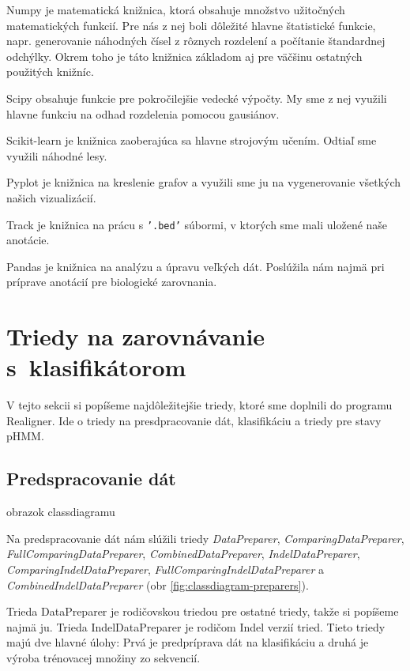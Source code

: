 Numpy je matematická knižnica, ktorá obsahuje množstvo užitočných matematických funkcií. Pre nás z nej boli dôležité hlavne štatistické funkcie, napr. generovanie náhodných čísel z rôznych rozdelení a počítanie štandardnej odchýlky. Okrem toho je táto knižnica základom aj pre väčšinu ostatných použitých knižníc.

Scipy obsahuje funkcie pre pokročilejšie vedecké výpočty. My sme z nej využili hlavne funkciu na odhad rozdelenia pomocou gausiánov.

Scikit-learn je knižnica zaoberajúca sa hlavne strojovým učením. Odtiaľ sme využili náhodné lesy.

Pyplot je knižnica na kreslenie grafov a využili sme ju na vygenerovanie všetkých našich vizualizácií.

Track je knižnica na prácu s {\tt '.bed'} súbormi, v ktorých sme mali uložené naše anotácie.

Pandas je knižnica na analýzu a úpravu veľkých dát. Poslúžila nám najmä pri príprave anotácií pre biologické zarovnania.

\section[Triedy na zarovnávanie s klas.]{Triedy na zarovnávanie s~klasifikátorom}

V tejto sekcii si popíšeme najdôležitejšie triedy, ktoré sme doplnili do programu Realigner. Ide o triedy na presdpracovanie dát, klasifikáciu a triedy pre stavy pHMM.

\subsection{Predspracovanie dát}

\todo obrazok classdiagramu

Na predspracovanie dát nám slúžili triedy \textit{DataPreparer}, \textit{ComparingDataPreparer}, \textit{FullComparingDataPreparer}, \textit{CombinedDataPreparer},
\textit{IndelDataPreparer}, \textit{ComparingIndelDataPreparer}, \textit{FullComparingIndelDataPreparer} a \textit{CombinedIndelDataPreparer} (obr \ref{fig:classdiagram-preparers}).

Trieda DataPreparer je rodičovskou triedou pre ostatné triedy, takže si popíšeme najmä ju. Trieda IndelDataPreparer je rodičom Indel verzií tried. Tieto triedy majú dve hlavné úlohy: Prvá je predpríprava dát na klasifikáciu a druhá je výroba trénovacej množiny zo sekvencií.

